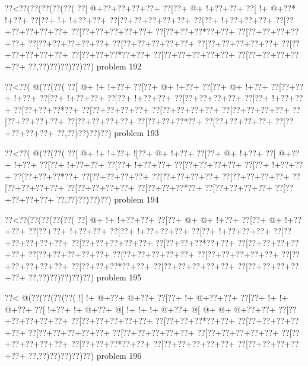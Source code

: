\vbox{\vbox{\goo
\0??<\0??(\0??(\0??(\0??(\0??(
\0??[\- @+\0??+\0??+\0??+\0??+
\0??[\0??+\- @+\- !+\0??+\0??+
\0??[\- !+\- @+\0??*\- !+\0??+
\0??[\0??+\- !+\- !+\0??+\0??+
\0??[\0??+\0??+\0??+\0??+\0??+
\0??[\0??+\- !+\0??+\0??+\0??+
\0??[\0??+\0??+\0??+\0??+\0??+
\0??[\0??+\0??+\0??+\0??+\0??+
\0??[\0??+\0??+\0??*\0??+\0??+
\0??[\0??+\0??+\0??+\0??+\0??+
\0??[\0??+\0??+\0??+\0??+\0??+
\0??[\0??+\0??+\0??+\0??+\0??+
\0??[\0??+\0??+\0??+\0??+\0??+
\0??[\0??+\0??+\0??+\0??+\0??+
\0??[\0??+\0??+\0??*\0??+\0??+
\0??[\0??+\0??+\0??+\0??+\0??+
\0??[\0??+\0??+\0??+\0??+\0??+
\0??,\0??)\0??)\0??)\0??)\0??)
}
\hfil problem 192\hfil\break
}

\vbox{\vbox{\goo
\0??<\0??(\- @(\0??(\0??(
\0??[\- @+\- !+\- !+\0??+
\0??[\0??+\- @+\- !+\0??+
\0??[\0??+\- @+\- !+\0??+
\0??[\0??+\0??+\- !+\0??+
\0??[\0??+\- !+\0??+\0??+
\0??[\0??+\- !+\0??+\0??+
\0??[\0??+\0??+\0??+\0??+
\0??[\0??+\- !+\0??+\0??+
\0??[\0??+\0??+\0??*\0??+
\0??[\0??+\0??+\0??+\0??+
\0??[\0??+\0??+\0??+\0??+
\0??[\0??+\0??+\0??+\0??+
\0??[\0??+\0??+\0??+\0??+
\0??[\0??+\0??+\0??+\0??+
\0??[\0??+\0??+\0??*\0??+
\0??[\0??+\0??+\0??+\0??+
\0??[\0??+\0??+\0??+\0??+
\0??,\0??)\0??)\0??)\0??)
}
\hfil problem 193\hfil\break
}

\vbox{\vbox{\goo
\0??<\0??(\- @(\0??(\0??(
\0??[\- @+\- !+\- !+\0??+
\- ![\0??+\- @+\- !+\0??+
\0??[\0??+\- @+\- !+\0??+
\0??[\- @+\0??+\- !+\0??+
\0??[\0??+\- !+\0??+\0??+
\0??[\0??+\- !+\0??+\0??+
\0??[\0??+\0??+\0??+\0??+
\0??[\0??+\- !+\0??+\0??+
\0??[\0??+\0??+\0??*\0??+
\0??[\0??+\0??+\0??+\0??+
\0??[\0??+\0??+\0??+\0??+
\0??[\0??+\0??+\0??+\0??+
\0??[\0??+\0??+\0??+\0??+
\0??[\0??+\0??+\0??+\0??+
\0??[\0??+\0??+\0??*\0??+
\0??[\0??+\0??+\0??+\0??+
\0??[\0??+\0??+\0??+\0??+
\0??,\0??)\0??)\0??)\0??)
}
\hfil problem 194\hfil\break
}

\vbox{\vbox{\goo
\0??<\0??(\0??(\0??(\0??(\0??(
\0??[\- @+\- !+\- !+\0??+\0??+
\0??[\0??+\- @+\- @+\- !+\0??+
\0??[\0??+\- @+\- !+\0??+\0??+
\0??[\0??+\0??+\- !+\0??+\0??+
\0??[\0??+\- !+\0??+\0??+\0??+
\0??[\0??+\- !+\0??+\0??+\0??+
\0??[\0??+\0??+\0??+\0??+\0??+
\0??[\0??+\0??+\0??+\0??+\0??+
\0??[\0??+\0??+\0??*\0??+\0??+
\0??[\0??+\0??+\0??+\0??+\0??+
\0??[\0??+\0??+\0??+\0??+\0??+
\0??[\0??+\0??+\0??+\0??+\0??+
\0??[\0??+\0??+\0??+\0??+\0??+
\0??[\0??+\0??+\0??+\0??+\0??+
\0??[\0??+\0??+\0??*\0??+\0??+
\0??[\0??+\0??+\0??+\0??+\0??+
\0??[\0??+\0??+\0??+\0??+\0??+
\0??,\0??)\0??)\0??)\0??)\0??)
}
\hfil problem 195\hfil\break
}

\vbox{\vbox{\goo
\0??<\- @(\0??(\0??(\0??(\0??(
\- ![\- !+\- @+\0??+\- @+\0??+
\0??[\0??+\- !+\- @+\0??+\0??+
\0??[\0??+\- !+\- !+\- @+\0??+
\0??[\- !+\0??+\- !+\- @+\0??+
\- @[\- !+\- !+\- !+\- @+\0??+
\- @[\- @+\- @+\- @+\0??+\0??+
\0??[\0??+\0??+\0??+\0??+\0??+
\0??[\0??+\0??+\0??+\0??+\0??+
\0??[\0??+\0??+\0??*\0??+\0??+
\0??[\0??+\0??+\0??+\0??+\0??+
\0??[\0??+\0??+\0??+\0??+\0??+
\0??[\0??+\0??+\0??+\0??+\0??+
\0??[\0??+\0??+\0??+\0??+\0??+
\0??[\0??+\0??+\0??+\0??+\0??+
\0??[\0??+\0??+\0??*\0??+\0??+
\0??[\0??+\0??+\0??+\0??+\0??+
\0??[\0??+\0??+\0??+\0??+\0??+
\0??,\0??)\0??)\0??)\0??)\0??)
}
\hfil problem 196\hfil\break
}

